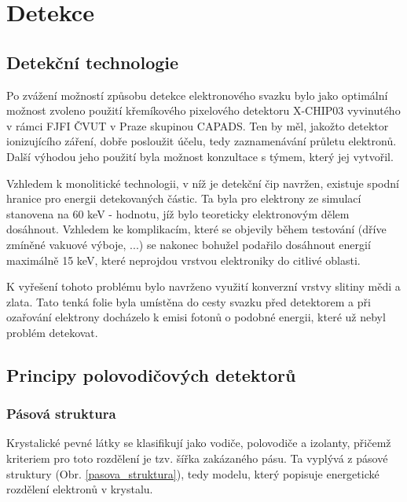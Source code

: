 \newcommand{\fig}[3]{ 
	\begin{figure}[!ht]
		\centering
		\texttt{[image: Figure/07/\#2.png]}
		\caption{#3}
		\label{#2}
	\end{figure}
}

\renewcommand{\figurename}{Obr.}
\newcommand{\figref}[1]{\figurename \hspace{1 pt} \ref{#1}}

\newpage \clearpage

\chapter{Detekce}

\section{Detekční technologie}
Po zvážení možností způsobu detekce elektronového svazku bylo jako optimální možnost zvoleno použití křemíkového pixelového detektoru X-CHIP03 vyvinutého v rámci FJFI ČVUT v Praze skupinou CAPADS. Ten by měl, jakožto detektor ionizujícího záření, dobře posloužit účelu, tedy zaznamenávání průletu elektronů. Další výhodou jeho použití byla možnost konzultace s týmem, který jej vytvořil. 

Vzhledem k monolitické technologii, v níž je detekční čip navržen, existuje spodní hranice pro energii detekovaných částic. Ta byla pro elektrony ze simulací stanovena na 60 keV - hodnotu, jíž bylo teoreticky elektronovým dělem dosáhnout. Vzhledem ke komplikacím, které se objevily během testování (dříve zmíněné vakuové výboje, ...) se nakonec bohužel podařilo dosáhnout energií maximálně 15 keV, které neprojdou vrstvou elektroniky do citlivé oblasti.

K vyřešení tohoto problému bylo navrženo využití konverzní vrstvy slitiny mědi a zlata. Tato tenká folie byla umístěna do cesty svazku před detektorem a při ozařování elektrony docházelo k emisi fotonů o podobné energii, které už nebyl problém detekovat. 

\section{Principy polovodičových detektorů}
\subsection{Pásová struktura}
Krystalické pevné látky se klasifikují jako vodiče, polovodiče a izolanty, přičemž kriteriem pro toto rozdělení je tzv. šířka zakázaného pásu. Ta vyplývá z pásové struktury (\figref{pasova_struktura}), tedy modelu, který popisuje energetické rozdělení elektronů v krystalu. 

